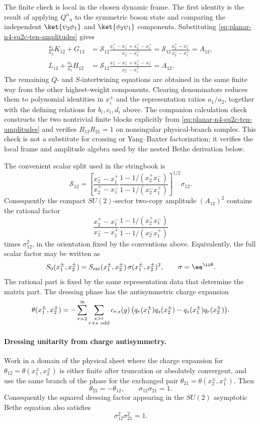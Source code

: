 The finite check is local in the chosen dynamic frame.  The first identity is
the result of applying \(Q^\alpha{}_a\) to the symmetric boson state and
comparing the independent
\(\ket{\psi_2\phi_1}\) and \(\ket{\phi_2\psi_1}\) components.  Substituting
\eqref{eq:planar-n4-su2c-ten-amplitudes} gives
\[
\begin{aligned}
  \frac{a_1}{a_2}K_{12}+G_{12}
  &=
  \mathcal S_{12}
  \frac{x_1^+-x_1^-+x_2^+-x_1^+}{x_2^- -x_1^+}
  =
  \mathcal S_{12}
  \frac{x_2^+-x_1^-}{x_2^- -x_1^+}
  =
  A_{12},\\
  L_{12}+\frac{a_2}{a_1}H_{12}
  &=
  \mathcal S_{12}
  \frac{x_2^- -x_1^-+x_2^+-x_2^-}{x_2^- -x_1^+}
  =
  A_{12}.
\end{aligned}
\]
The remaining \(Q\)- and \(S\)-intertwining equations are obtained in the same
finite way from the other highest-weight components.  Clearing denominators
reduces them to polynomial identities in \(x_i^\pm\) and the representation
ratios \(a_1/a_2\), together with the defining relations for \(b_i,c_i,d_i\)
above.  The companion calculation check constructs the two nontrivial finite
blocks explicitly from \eqref{eq:planar-n4-su2c-ten-amplitudes} and verifies
\(R_{12}R_{21}=1\) on nonsingular physical-branch samples.  This check is not
a substitute for crossing or Yang--Baxter factorization; it verifies the
local frame and amplitude algebra used by the nested Bethe derivation below.

The convenient scalar split used in the stringbook is
\[
  \mathcal S_{12}
  =
  \left[
  \frac{x_2^- -x_1^+}{x_2^+ -x_1^-}
  \frac{1-1/(x_2^+x_1^-)}{1-1/(x_2^-x_1^+)}
  \right]^{1/2}\sigma_{12}.
\]
Consequently the compact \(SU(2)\)-sector two-copy amplitude
\((A_{12})^2\) contains the rational factor
\[
  \frac{x_2^+-x_1^-}{x_2^- -x_1^+}
  \frac{1-1/(x_2^+x_1^-)}{1-1/(x_2^-x_1^+)}
\]
times \(\sigma_{12}^2\), in the orientation fixed by the conventions above.
Equivalently, the full scalar factor may be written as
\[
  S_0(x_1^\pm,x_2^\pm)
  =
  S_{\rm rat}(x_1^\pm,x_2^\pm)\,
  \sigma(x_1^\pm,x_2^\pm)^2,
  \qquad
  \sigma=\ee^{\ii\theta}.
\]
The rational part is fixed by the same representation data that determine
the matrix part.  The dressing phase has the antisymmetric charge expansion
\[
  \theta(x_1^\pm,x_2^\pm)
  =
  -
  \sum_{r=2}^\infty\sum_{\substack{s>r\\ r+s\ {\rm odd}}}
  c_{r,s}(g)\,
  \bigl(q_r(x_1^\pm)q_s(x_2^\pm)-q_s(x_1^\pm)q_r(x_2^\pm)\bigr).
\]

\paragraph{Dressing unitarity from charge antisymmetry.}
Work in a domain of the physical sheet where the charge expansion for
\(\theta_{12}=\theta(x_1^\pm,x_2^\pm)\) is either finite after truncation or
absolutely convergent, and use the same branch of the phase for the exchanged
pair \(\theta_{21}=\theta(x_2^\pm,x_1^\pm)\).  Then
\[
  \theta_{21}=-\theta_{12},
  \qquad
  \sigma_{12}\sigma_{21}=1.
\]
Consequently the squared dressing factor appearing in the \(SU(2)\)
asymptotic Bethe equation also satisfies
\[
  \sigma_{12}^2\sigma_{21}^2=1 .
\]

